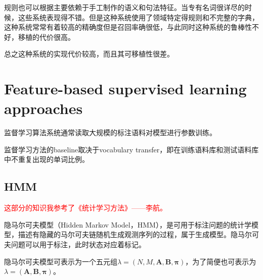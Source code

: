 \documentclass[a4paper,UTF8,no-math]{ctexart}
\begin{document}
	规则也可以根据主要依赖于手工制作的语义和句法特征。当专有名词很详尽的时候，这些系统表现得不错。但是这种系统使用了领域特定得规则和不完整的字典，这种系统常常有着较高的精确度但是召回率确很低，与此同时这种系统的鲁棒性不好，移植的代价很高。
	
	总之这种系统的实现代价较高，而且其可移植性很差。
	
%	
%	
%	
%	
	
	
	\section{Feature-based supervised learning approaches}
	
	监督学习算法系统通常读取大规模的标注语料对模型进行参数训练。
	
	监督学习方法的baseline取决于vocabulary transfer，即在训练语料库和测试语料库中不重复出现的单词比例。
	
	\subsection{HMM}
	
	
	
	\textcolor{red}{这部分的知识我参考了《统计学习方法》——李航。}
	
	隐马尔可夫模型（Hidden Markov Model，HMM），是可用于标注问题的统计学模型，描述有隐藏的马尔可夫链随机生成观测序列的过程，属于生成模型。隐马尔可夫问题可以用于标注，此时状态对应着标记。
	
	
	
	隐马尔可夫模型可表示为一个五元组$\lambda=(N,M,\mathbf{A}, \mathbf{B}, \mathbf{\pi})$，为了简便也可表示为$\lambda=(\mathbf{A}, \mathbf{B}, \mathbf{\pi})$。
	
\end{document}
